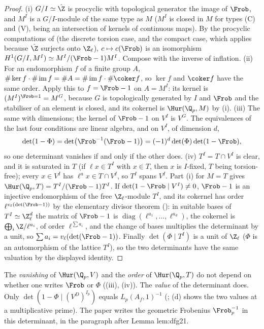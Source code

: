 \begin{proof}
(i) $G/I\simeq\hat\Z$ is procyclic with topological generator the image of $\Frob$, and $M^I$ is a $G/I$-module of the same type as $M$ ($M^I$ is closed in $M$ for types
(C) and (V), being an intersection of kernels of continuous maps). By the procyclic computations of  (the discrete torsion case, and the compact
case, which applies because $\hat\Z$ surjects onto $\Z_\ell$), $c\mapsto c(\Frob)$ is an isomorphism $H^1(G/I,M^I)\simeq M^I/(\Frob-1)M^I$. Compose with the inverse of
inflation. (ii) For an endomorphism $f$ of a finite group $A$, $\#\ker f\cdot\#\operatorname{im}f=\#A=\#\operatorname{im}f\cdot\#\coker f$, so $\ker f$ and $\coker f$ have
the same order. Apply this to $f=\Frob-1$ on $A=M^I$: its kernel is $(M^I)^{\Frob=1}=M^G$, because $G$ is topologically generated by $I$ and $\Frob$ and the
stabiliser of an element is closed, and its cokernel is $\Hur(\Q_p,M)$ by (i). (iii) The same with
dimensions; the kernel of $\Frob-1$ on $V^I$ is $V^G$. The equivalences of the last four conditions are linear algebra, and on $V^I$, of dimension $d$,
\[
\det(1-\Phi)=\det\bigl(\Frob^{-1}(\Frob-1)\bigr)=(-1)^d\det(\Phi)\det(1-\Frob),
\]
so one determinant vanishes if and only if the other does. (iv) $T^I=T\cap V^I$ is clear, and it is saturated in $T$ (if $\ell x\in T^I$ with $x\in T$, then $x$ is $I$-fixed, $T$
being torsion-free); every $x\in V^I$ has $\ell^ax\in T\cap V^I$, so $T^I$ spans $V^I$. Part (i) for $M=T$ gives $\Hur(\Q_p,T)=T^I/(\Frob-1)T^I$. If $\det(1-\Frob\mid V^I)\ne0$,
$\Frob-1$ is an injective endomorphism of the free $\Z_\ell$-module $T^I$, and its cokernel has order $\ell^{v_\ell(\det(\Frob-1))}$ by the elementary divisor theorem
(): in suitable bases of $T^I\simeq\Z_\ell^d$ the matrix of $\Frob-1$ is $\operatorname{diag}(\ell^{a_1},\dots,\ell^{a_d})$, the cokernel is
$\bigoplus_i\Z/\ell^{a_i}$, of order $\ell^{\sum a_i}$, and the change of bases multiplies the determinant by a unit, so $\sum a_i=v_\ell(\det(\Frob-1))$. Finally $\det(\Phi\mid T^I)$ is a unit of $\Z_\ell$ ($\Phi$ is an automorphism of the lattice $T^I$), so the two determinants have the same valuation by
the displayed identity.
\end{proof}

\begin{warning}\label{warn:galcoh:frobenius}
The \emph{vanishing} of $\Hur(\Q_p,V)$ and the \emph{order} of $\Hur(\Q_p,T)$ do not depend on whether one writes $\Frob$ or $\Phi$ ((iii),
(iv)). The \emph{value} of the determinant does. Only $\det(1-\Phi\mid(V^D)^{I_p})$ equals $L_p(A_f,1)^{-1}$ (; (d)
shows the two values at a multiplicative prime). The paper writes the geometric Frobenius $\Frob_p^{-1}$ in this determinant, in the paragraph after Lemma lem:dfg21.
\end{warning}

